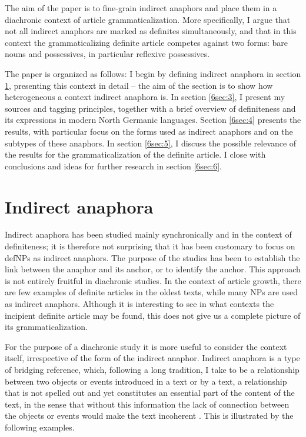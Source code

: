 \documentclass[output=paper]{langsci/langscibook}
\begin{document}
The aim of the paper is to fine-grain indirect anaphors and place them in a diachronic context of article grammaticalization. More specifically, I argue that not all indirect anaphors are marked as definites simultaneously, and that in this context the grammaticalizing definite article competes against two forms: bare nouns and possessives, in particular reflexive possessives. 

The paper is organized as follows: I begin by defining indirect anaphora in section \ref{6sec:2}, presenting this context in detail -- the aim of the section is to show how heterogeneous a context indirect anaphora is. In section \ref{6sec:3}, I present my sources and tagging principles, together with a brief overview of definiteness and its expressions in modern North Germanic languages. Section \ref{6sec:4} presents the results, with particular focus on the forms used as indirect anaphors and on the subtypes of these anaphors. In section \ref{6sec:5}, I discuss the possible relevance of the results for the grammaticalization of the definite article. I close with conclusions and ideas for further research in section \ref{6sec:6}. 


\section{Indirect anaphora}\label{6sec:2}

Indirect anaphora has been studied mainly synchronically and in the context of definiteness; it is therefore not surprising that it has been customary to focus on defNPs as indirect anaphors. The purpose of the studies has been to establish the link between the anaphor and its anchor, or to identify the anchor. This approach is not entirely fruitful in diachronic studies. In the context of article growth, there are few examples of definite articles in the oldest texts, while many NPs are used as indirect anaphors. Although it is interesting to see in what contexts the incipient definite article may be found, this does not give us a complete picture of its grammaticalization. 

For the purpose of a diachronic study it is more useful to consider the context itself, irrespective of the form of the indirect anaphor. Indirect anaphora is a type of bridging reference, which, following a long tradition, I take to be a relationship between two objects or events introduced in a text or by a text, a relationship that is not spelled out and yet constitutes an essential part of the content of the text, in the sense that without this information the lack of connection between the objects or events would make the text incoherent \citep{asher:lascarides:98}. This is illustrated by the following examples. 
\end{document}

